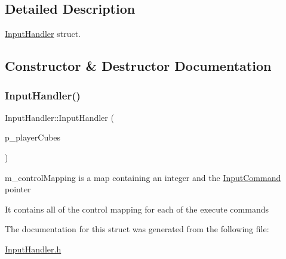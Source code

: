 \subsection{Detailed Description}
\mbox{\hyperlink{struct_input_handler}{Input\+Handler}} struct. 

\subsection{Constructor \& Destructor Documentation}
\mbox{\label{struct_input_handler_aba97e51610d5809dadb917a43057e921}} 
\subsubsection{\texorpdfstring{InputHandler()}{InputHandler()}}
{\footnotesize\ttfamily Input\+Handler\+::\+Input\+Handler (\begin{DoxyParamCaption}\item[{std\+::vector$<$ \mbox{\hyperlink{class_game_object}{Game\+Object}} $>$ $\ast$}]{p\+\_\+player\+Cubes }\end{DoxyParamCaption})\hspace{0.3cm}{\ttfamily [inline]}}



m\+\_\+control\+Mapping is a map containing an integer and the \mbox{\hyperlink{class_input_command}{Input\+Command}} pointer 

It contains all of the control mapping for each of the execute commands 

The documentation for this struct was generated from the following file\+:\begin{DoxyCompactItemize}
\item 
\mbox{\hyperlink{_input_handler_8h}{Input\+Handler.\+h}}\end{DoxyCompactItemize}
